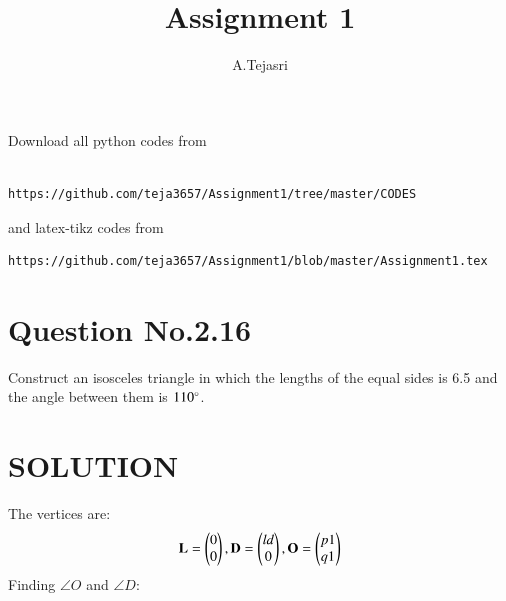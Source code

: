 \documentclass[journal,12pt,twocolumn]{IEEEtran}
\begin{document}
     \def\rightbox#1{\makebox[0in][r]{#1}}
     \def\centbox#1{\makebox[0in]{#1}}
     \def\topbox#1{\raisebox{-\baselineskip}[0in][0in]{#1}}
     \def\midbox#1{\raisebox{-0.5\baselineskip}[0in][0in]{#1}}
\vspace{3cm}
\title{Assignment 1}
\author{A.Tejasri}
\maketitle
\newpage
\bigskip
\renewcommand{\thefigure}{\theenumi}
\renewcommand{\thetable}{\theenumi}
Download all python codes from 
\begin{lstlisting}

https://github.com/teja3657/Assignment1/tree/master/CODES
\end{lstlisting}
%
and latex-tikz codes from 
%
\begin{lstlisting}
https://github.com/teja3657/Assignment1/blob/master/Assignment1.tex
\end{lstlisting}
%
\section{Question No.2.16}
Construct an isosceles triangle in which the lengths of the equal sides is 6.5 and the angle between them is $110{\degree}$.
%
\section{SOLUTION}
The vertices are:
\begin{align}
\mathbf{L} = \begin{pmatrix}0\\0\end{pmatrix},
\mathbf{D} = \begin{pmatrix}ld\\0\end{pmatrix}, 
\mathbf{O} = \begin{pmatrix}p1\\q1\end{pmatrix}
\end{align}
Finding $\angle O$ and $\angle D$:
\end{document}
